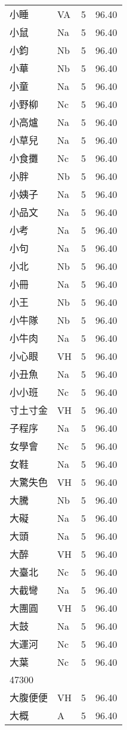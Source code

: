 \documentclass[twocolumn]{book}
\begin{document}
\begin{supertabular}{llrr}
小睡 & VA & 5 &  96.40\\
小鼠 & Na & 5 &  96.40\\
小鈞 & Nb & 5 &  96.40\\
小華 & Nb & 5 &  96.40\\
小童 & Na & 5 &  96.40\\
小野柳 & Nc & 5 &  96.40\\
小高爐 & Na & 5 &  96.40\\
小草兒 & Na & 5 &  96.40\\
小食攤 & Nc & 5 &  96.40\\
小胖 & Nb & 5 &  96.40\\
小姨子 & Na & 5 &  96.40\\
小品文 & Na & 5 &  96.40\\
小考 & Na & 5 &  96.40\\
小句 & Na & 5 &  96.40\\
小北 & Nb & 5 &  96.40\\
小冊 & Na & 5 &  96.40\\
小王 & Nb & 5 &  96.40\\
小牛隊 & Nb & 5 &  96.40\\
小牛肉 & Na & 5 &  96.40\\
小心眼 & VH & 5 &  96.40\\
小丑魚 & Na & 5 &  96.40\\
小小班 & Nc & 5 &  96.40\\
寸土寸金 & VH & 5 &  96.40\\
子程序 & Na & 5 &  96.40\\
女學會 & Nc & 5 &  96.40\\
女鞋 & Na & 5 &  96.40\\
大驚失色 & VH & 5 &  96.40\\
大騰 & Nb & 5 &  96.40\\
大礙 & Na & 5 &  96.40\\
大頭 & Na & 5 &  96.40\\
大醉 & VH & 5 &  96.40\\
大臺北 & Nc & 5 &  96.40\\
大截彎 & Na & 5 &  96.40\\
大團圓 & VH & 5 &  96.40\\
大鼓 & Na & 5 &  96.40\\
大運河 & Nc & 5 &  96.40\\
大葉 & Nc & 5 &  96.40\\
47300\\
大腹便便 & VH & 5 &  96.40\\
大概 & A & 5 &  96.40\\

\end{supertabular}
\end{document}
